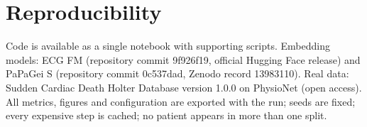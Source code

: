 \documentclass[11pt]{article}
\begin{document}
\section{Reproducibility}
Code is available as a single notebook with supporting scripts. Embedding models:
ECG FM (repository commit 9f926f19, official Hugging Face release) and PaPaGei S
(repository commit 0c537dad, Zenodo record 13983110). Real data: Sudden Cardiac
Death Holter Database version 1.0.0 on PhysioNet (open access). All metrics,
figures and configuration are exported with the run; seeds are fixed; every
expensive step is cached; no patient appears in more than one split.
\end{document}
